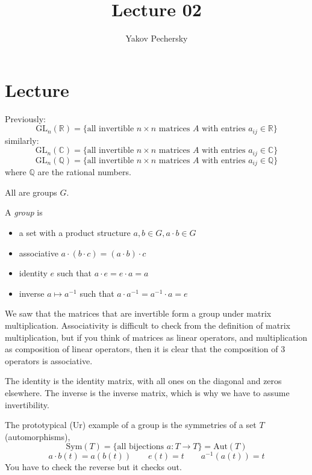 \documentclass[12pt]{article}
\newcommand{\RR}{\mathbb{R}}
\newcommand{\GL}{\text{GL}}
\newcommand{\inv}[1]{#1^{-1}}
\theoremstyle{definition}
\begin{document}
\author{Yakov Pechersky}

\title{Lecture 02}

\maketitle

\section*{Lecture}

Previously: \[\GL_n (\RR) = \{ \text{all invertible } n \times n \text{ matrices } A \text{ with entries } a_{ij} \in \RR \} \]
similarly:
\[\GL_n (\mathbb{C}) = \{ \text{all invertible } n \times n \text{ matrices } A \text{ with entries } a_{ij} \in \mathbb{C} \} \]
\[\GL_n (\mathbb{Q}) = \{ \text{all invertible } n \times n \text{ matrices } A \text{ with entries } a_{ij} \in \mathbb{Q} \} \]
where \(\mathbb{Q}\) are the rational numbers.

All are groups \(G\).

A \emph{group} is \begin{itemize} \setlength\itemsep{0em}
    \item a set with a product structure \(a, b \in G, a \cdot b \in G\)
    \item associative \(a \cdot (b \cdot c) = (a \cdot b) \cdot c\)
    \item identity \(e\) such that \(a \cdot e = e \cdot a = a\)
    \item inverse \(a \mapsto \inv{a}\) such that \(a \cdot \inv{a} = \inv{a} \cdot a = e\)
\end{itemize}

We saw that the matrices that are invertible form a group under matrix multiplication.
Associativity is difficult to check from the definition of matrix multiplication, but
if you think of matrices as linear operators, and multiplication as composition of linear
operators, then it is clear that the composition of 3 operators is associative.

The identity is the identity matrix, with all ones on the diagonal and zeros elsewhere.
The inverse is the inverse matrix, which is why we have to assume invertibility.

The prototypical (Ur) example of a group is the symmetries of a set \(T\) (automorphisms),
\[\text{Sym}(T) = \{\text{all bijections } a : T \to T \} = \text{Aut}(T) \]
\[ a \cdot b (t) = a(b(t)) \qquad e(t) = t \qquad \inv{a}(a(t)) = t\]
You have to check the reverse but it checks out.
\end{document}

